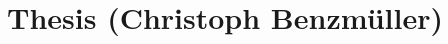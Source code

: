 \documentclass{article}
\begin{document}
\title{Thesis  (Christoph Benzm{\"u}ller)}
\maketitle
\nocite{*}

%

\end{document}
